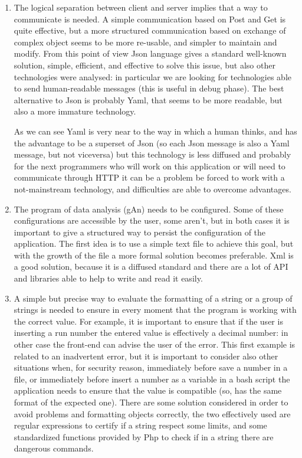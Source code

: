 \begin{enumerate}
\item
The logical separation between client and server implies that a way to communicate is needed. A simple communication based on Post and Get is quite effective, but a more structured communication based on exchange of complex object seems to be more re-usable, and simpler to maintain and modify. From this point of view Json language gives a standard well-known solution, simple, efficient, and effective to solve this issue, but also other technologies were analysed: in particular we are looking for technologies able to send human-readable messages (this is useful in debug phase). The best alternative to Json is probably Yaml, that seems to be more readable, but also a more immature technology. 

As we can see Yaml is very near to the way in which a human thinks, and has the advantage to be a superset of Json (so each Json message is also a Yaml message, but not viceversa) but this technology is less diffused and probably for the next programmers who will work on this application or will need to communicate through HTTP it can be a problem be forced to work with a not-mainstream technology, and difficulties are able to overcome advantages. 

\item
The program of data analysis (gAn) needs to be configured. Some of these configurations are accessible by the user, some aren't, but in both cases it is important to give a structured way to persist the configuration of the application. The first idea is to use a simple text file to achieve this goal, but with the growth of the file a more formal solution becomes preferable. Xml is a good solution, because it is a diffused standard and there are a lot of API and libraries able to help to write and read it easily.

\item
A simple but precise way to evaluate the formatting of a string or a group of strings is needed to ensure in every moment that the program is working with the correct value. For example, it is important to ensure that if the user is inserting a run number the entered value is effectively a decimal number: in other case the front-end can advise the user of the error. This first example is related to an inadvertent error, but it is important to consider also other situations when, for security reason, immediately before save a number in a file, or immediately before insert a number as a variable in a bash script the application needs to ensure that the value is compatible (so, has the same format of the expected one). There are some solution considered in order to avoid problems and formatting objects correctly, the two effectively used are regular expressions to certify if a string respect some limits, and some standardized functions provided by Php to check if in a string there are dangerous commands.
 

\end{enumerate}
